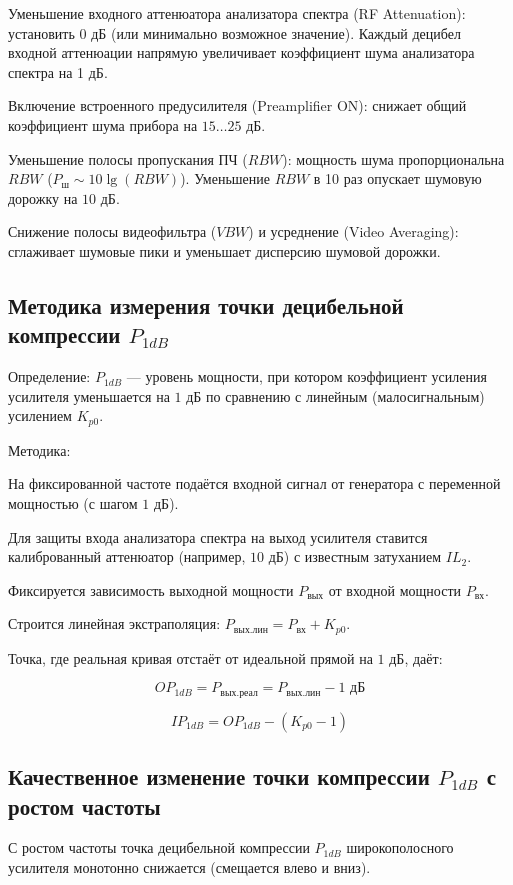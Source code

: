 Уменьшение входного аттенюатора анализатора спектра (RF Attenuation): установить $0\text{ дБ}$ (или минимально возможное значение). Каждый децибел входной аттенюации напрямую увеличивает коэффициент шума анализатора спектра на 1 дБ.

Включение встроенного предусилителя (Preamplifier ON): снижает общий коэффициент шума прибора на $15 \dots 25\text{ дБ}$.

Уменьшение полосы пропускания ПЧ ($RBW$): мощность шума пропорциональна $RBW$ ($P_{\text{ш}} \sim 10\lg(RBW)$). Уменьшение $RBW$ в 10 раз опускает шумовую дорожку на $10\text{ дБ}$.

Снижение полосы видеофильтра ($VBW$) и усреднение (Video Averaging): сглаживает шумовые пики и уменьшает дисперсию шумовой дорожки.

\subsection* {Методика измерения точки децибельной компрессии $P_{1dB}$}

Определение: $P_{1dB}$ — уровень мощности, при котором коэффициент усиления усилителя уменьшается на $1\text{ дБ}$ по сравнению с линейным (малосигнальным) усилением $K_{p0}$.

Методика:

На фиксированной частоте подаётся входной сигнал от генератора с переменной мощностью (с шагом $1\text{ дБ}$).

Для защиты входа анализатора спектра на выход усилителя ставится калиброванный аттенюатор (например, $10\text{ дБ}$) с известным затуханием $IL_2$.

Фиксируется зависимость выходной мощности $P_{\text{вых}}$ от входной мощности $P_{\text{вх}}$.

Строится линейная экстраполяция: $P_{\text{вых.лин}} = P_{\text{вх}} + K_{p0}$.

Точка, где реальная кривая отстаёт от идеальной прямой на $1\text{ дБ}$, даёт:


$$OP_{1dB} = P_{\text{вых.реал}} = P_{\text{вых.лин}} - 1\text{ дБ}$$

$$IP_{1dB} = OP_{1dB} - (K_{p0} - 1)$$

\subsection* {Качественное изменение точки компрессии $P_{1dB}$ с ростом частоты}

С ростом частоты точка децибельной компрессии $P_{1dB}$ широкополосного усилителя монотонно снижается (смещается влево и вниз).

